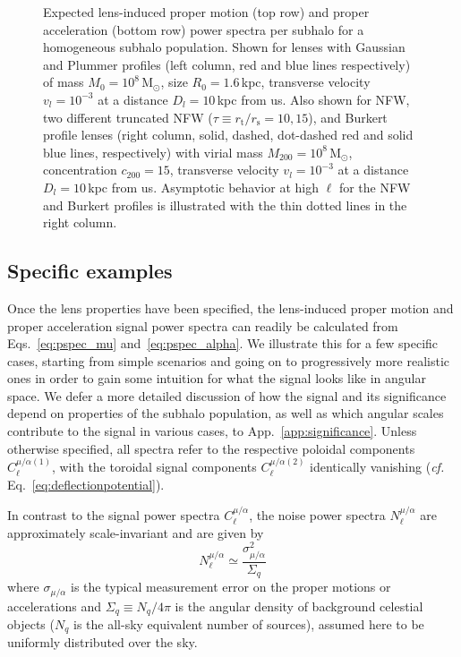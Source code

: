 \documentclass[prd,aps,twocolumn,nofootinbib,superscriptaddress,preprintnumbers,balancelastpage,longbibliography,floatfix]{revtex4-1}
\begin{document}
\begin{figure}[htbp]
\caption{Expected lens-induced proper motion (top row) and proper acceleration (bottom row) power spectra per subhalo for a homogeneous subhalo population. Shown for lenses with Gaussian and Plummer profiles (left column, red and blue lines respectively) of mass $M_0 = 10^{8}$\,M$_\odot$, size $R_0=1.6$\,kpc, transverse velocity  $v_l=10^{-3}$ at a distance $D_l=10$\,kpc from us. Also shown for NFW, two different truncated NFW ($\tau \equiv r_\mathrm{t}/r_\mathrm{s} = 10, 15$), and Burkert profile lenses (right column, solid, dashed, dot-dashed red and solid blue lines, respectively) with virial mass $M_{200}=10^{8}$\,M$_\odot$, concentration $c_{200}=15$, transverse velocity $v_l=10^{-3}$ at a distance $D_l=10$\,kpc from us. Asymptotic behavior at high $\ell$ for the NFW and Burkert profiles is illustrated with the thin dotted lines in the right column. } 
\label{fig:single_sub}
\end{figure}

\subsection{Specific examples}
\label{sec:examples}

Once the lens properties have been specified, the lens-induced proper motion and proper acceleration signal power spectra can readily be calculated from Eqs.~\eqref{eq:pspec_mu} and~\eqref{eq:pspec_alpha}. We illustrate this for a few specific cases, starting from simple scenarios and going on to progressively more realistic ones in order to gain some intuition for what the signal looks like in angular space. We defer a more detailed discussion of how the signal and its significance depend on properties of the subhalo population, as well as which angular scales contribute to the signal in various cases, to App.~\ref{app:significance}. Unless otherwise specified, all spectra refer to the respective poloidal components $C_{\ell}^{\mu/\alpha (1)}$, with the toroidal signal components $C_{\ell}^{\mu/\alpha (2)}$ identically vanishing (\emph{cf.} Eq.~\eqref{eq:deflectionpotential}).

In contrast to the signal power spectra $C_{\ell}^{\mu/\alpha}$, the noise power spectra $N_{\ell}^{\mu/\alpha}$ are approximately scale-invariant and are given by
\begin{equation}
N_{\ell}^{\mu/\alpha} \simeq \frac{\sigma_{\mu/\alpha}^2}{\Sigma_q} \label{eq:noise_powspec}
\end{equation}
where $\sigma_{\mu/\alpha}$ is the typical measurement error on the proper motions or accelerations and $\Sigma_q \equiv N_q / 4\pi $ is the angular density of background celestial objects ($N_q$ is the all-sky equivalent number of sources), assumed here to be uniformly distributed over the sky.
\end{document}
